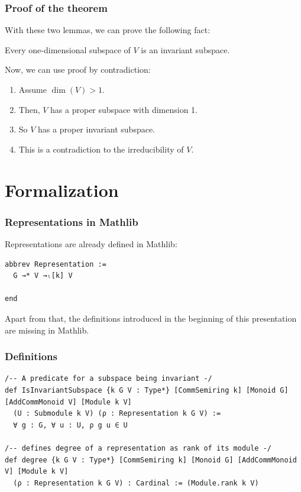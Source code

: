 \documentclass{beamer}
\begin{document}
\begin{frame}
\frametitle{Proof of the theorem}
With these two lemmas, we can prove the following fact:
\begin{lemma}
Every one-dimensional subspace of \(V\) is an invariant subspace.
\end{lemma}
\pause
Now, we can use proof by contradiction:
\pause
\begin{enumerate}
\item Assume \(\dim (V) > 1\).
\pause
\item Then, \(V\) has a proper subspace with dimension 1.
\pause
\item So \(V\) has a proper invariant subspace.
\pause
\item This is a contradiction to the irreducibility of \(V\).
\end{enumerate}
\end{frame}


\section{Formalization}
\begin{frame}[fragile]
\frametitle{Representations in Mathlib}
Representations are already defined in Mathlib:
\begin{lstlisting}
abbrev Representation :=
  G →* V →ₗ[k] V

end
\end{lstlisting}
\pause
Apart from that, the definitions introduced in the beginning of this presentation are missing in Mathlib.
\end{frame}


\begin{frame}[fragile]
\frametitle{Definitions}
\begin{lstlisting}
/-- A predicate for a subspace being invariant -/
def IsInvariantSubspace {k G V : Type*} [CommSemiring k] [Monoid G] [AddCommMonoid V] [Module k V]
  (U : Submodule k V) (ρ : Representation k G V) :=
  ∀ g : G, ∀ u : U, ρ g u ∈ U

/-- defines degree of a representation as rank of its module -/
def degree {k G V : Type*} [CommSemiring k] [Monoid G] [AddCommMonoid V] [Module k V]
  (ρ : Representation k G V) : Cardinal := (Module.rank k V)
\end{lstlisting}
\end{frame}
\end{document}
